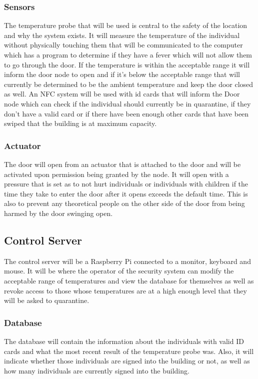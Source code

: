 \subsubsection{Sensors}
The temperature probe that will be used is central to the safety of the location
and why the system exists. It will measure the temperature of the individual
without physically touching them that will be communicated to the computer which
has a program to determine if they have a fever which will not allow them to go
through the door. If the temperature is within the acceptable range it will
inform the door node to open and if it's below the acceptable range that will
currently be determined to be the ambient temperature and keep the door closed
as well. An NFC system will be used with id cards that will inform the Door node
which can check if the individual should currently be in quarantine, if they
don't have a valid card or if there have been enough other cards that have been
swiped that the building is at maximum capacity.

\subsubsection{Actuator}
The door will open from an actuator that is attached to the door and will be
activated upon permission being granted by the node. It will open with a
pressure that is set as to not hurt individuals or individuals with children if
the time they take to enter the door after it opens exceeds the default time.
This is also to prevent any theoretical people on the other side of the door
from being harmed by the door swinging open.

\subsection{Control Server}
The control server will be a Raspberry Pi connected to a monitor, keyboard and
mouse. It will be where the operator of the security system can modify the
acceptable range of temperatures and view the database for themselves as well as
revoke access to those whose temperatures are at a high enough level that they
will be asked to quarantine.

\subsubsection{Database}
The database will contain the information about the individuals with valid ID
cards and what the most recent result of the temperature probe was. Also, it
will indicate whether those individuals are signed into the building or not, as
well as how many individuals are currently signed into the building.

